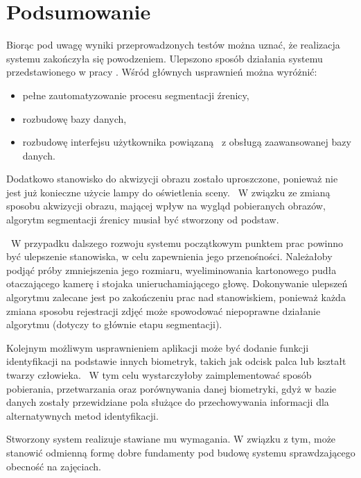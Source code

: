 \chapter{Podsumowanie}
\label{cha:podsumowanie}

Biorąc pod uwagę wyniki przeprowadzonych testów można uznać, że realizacja systemu zakończyła się powodzeniem. Ulepszono sposób działania systemu przedstawionego w pracy \cite{Gl11}. Wśród głównych usprawnień można wyróżnić:
\begin{itemize}
\item pełne zautomatyzowanie procesu segmentacji źrenicy,
\item rozbudowę bazy danych,
\item rozbudowę interfejsu użytkownika powiązaną ~z obsługą zaawansowanej bazy danych.
\end{itemize}

Dodatkowo stanowisko do akwizycji obrazu zostało uproszczone, ponieważ nie jest już konieczne użycie lampy do oświetlenia sceny. ~W związku ze zmianą sposobu akwizycji obrazu, mającej wpływ na wygląd pobieranych obrazów, algorytm segmentacji źrenicy musiał być stworzony od podstaw. 

~W przypadku dalszego rozwoju systemu początkowym punktem prac powinno być ulepszenie stanowiska, w celu zapewnienia jego przenośności. Należałoby podjąć próby zmniejszenia jego rozmiaru, wyeliminowania kartonowego pudła otaczającego kamerę i stojaka unieruchamiającego głowę. Dokonywanie ulepszeń algorytmu zalecane jest po zakończeniu prac nad stanowiskiem, ponieważ każda zmiana sposobu rejestracji zdjęć może spowodować niepoprawne działanie algorytmu (dotyczy to głównie etapu segmentacji).

Kolejnym możliwym usprawnieniem aplikacji może być dodanie funkcji identyfikacji na podstawie innych biometryk, takich jak odcisk palca lub kształt twarzy człowieka. ~W tym celu wystarczyłoby zaimplementować sposób pobierania, przetwarzania oraz porównywania danej biometryki, gdyż w bazie danych zostały przewidziane pola służące do przechowywania informacji dla alternatywnych metod identyfikacji.

Stworzony system realizuje stawiane mu wymagania. W związku z tym, może stanowić odmienną formę dobre fundamenty pod budowę systemu sprawdzającego obecność na zajęciach.
